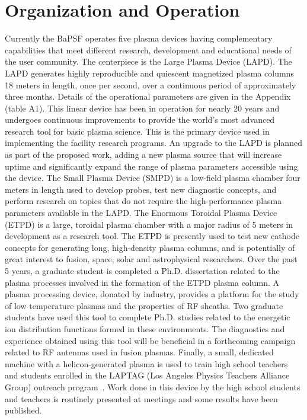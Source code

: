\documentclass[11pt]{article}
\begin{document}
\section{Organization and Operation}

Currently the BaPSF operates five plasma devices having complementary
capabilities that meet different research, development and educational
needs of the user community. The centerpiece is the Large Plasma Device
(LAPD). The LAPD generates highly reproducible and quiescent magnetized
plasma columns 18 meters in length, once per second, over a continuous
period of approximately three months. Details of the operational parameters are given in the Appendix
(table A1). This linear device has been in operation for nearly 20 years
and undergoes continuous improvements to provide the world's
most advanced research tool for basic plasma science. This is the
primary device used in implementing
the facility research programs. An upgrade to the LAPD is planned as
part of the proposed work, adding a new plasma source that will increase
uptime and significantly expand the range of plasma parameters
accessible using the device. The Small Plasma Device (SMPD) is a
low-field plasma chamber four meters in length used to develop probes,
test new diagnostic concepts, and perform research on topics that do not
require the high-performance plasma parameters available in the LAPD.
The Enormous Toroidal Plasma Device (ETPD) is a large, toroidal plasma
chamber with a major radius of 5 meters in development as a research
tool. The ETPD is presently used to test new cathode concepts for
generating long, high-density plasma columns, and is potentially of
great interest to fusion, space, solar and astrophysical researchers.
Over the past 5 years, a graduate student is completed a Ph.D.
dissertation related to the plasma processes involved in the formation
of the ETPD plasma column. A plasma processing device, donated by
industry, provides a platform for the study of low temperature plasmas
and the properties of RF sheaths. Two graduate students have used this
tool to complete Ph.D. studies related to the energetic ion distribution
functions formed in these environments. The diagnostics and experience
obtained using this tool will be beneficial in a forthcoming campaign
related to RF antennas used in fusion plasmas. Finally, a small,
dedicated machine with a helicon-generated plasma is used to train high
school teachers and students enrolled in the LAPTAG (Los Angeles
Physics Teachers Alliance Group) outreach program~\citep{laptag}.
Work done in this device by the high school students and teachers is
routinely presented at meetings and some results have been published.
\end{document}
